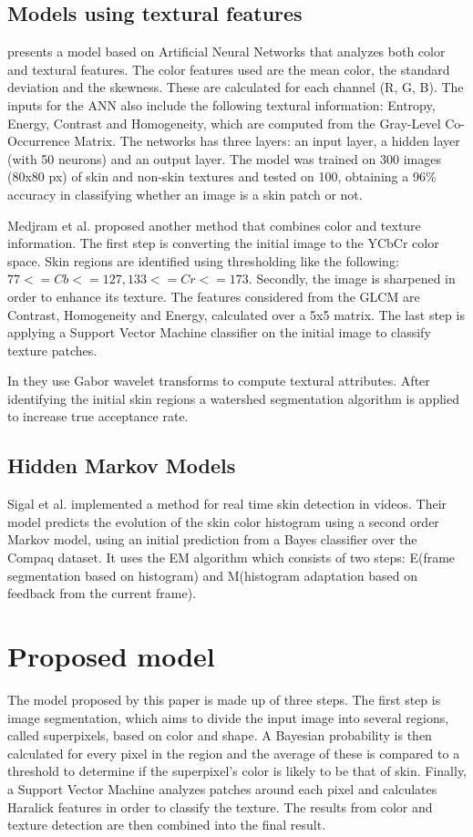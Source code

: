 \documentclass[12pt]{article}
\begin{document}
	\subsection{Models using textural features}
	\cite{color_texture_ann} presents a model based on Artificial Neural Networks that analyzes both color and textural features. The color features used are the mean color, the standard deviation and the skewness. These are calculated for each channel (R, G, B). The inputs for the ANN also include the following textural information: Entropy, Energy, Contrast and Homogeneity, which are computed from the Gray-Level Co-Occurrence Matrix. The networks has three layers: an input layer, a hidden layer (with 50 neurons) and an output layer. The model was trained on 300 images (80x80 px) of skin and non-skin textures and tested on 100, obtaining a 96\% accuracy in classifying whether an image is a skin patch or not.
	
	Medjram et al.\cite{texture_svm} proposed another method that combines color and texture information. The first step is converting the initial image to the YCbCr color space. Skin regions are identified using thresholding like the following: \(77 <= Cb <= 127, 133 <= Cr <= 173\). Secondly, the image is sharpened in order to enhance its texture. The features considered from the GLCM are Contrast, Homogeneity and Energy, calculated over a 5x5 matrix. The last step is applying a Support Vector Machine classifier on the initial image to classify texture patches.
	
	In \cite{texture_gabor_wavelet} they use Gabor wavelet transforms to compute textural attributes. After identifying the initial skin regions a watershed segmentation algorithm is applied to increase true acceptance rate.
	
	\subsection{Hidden Markov Models}
	Sigal et al.\cite{hmm} implemented a method for real time skin detection in videos. Their model predicts the evolution of the skin color histogram using a second order Markov model, using an initial prediction from a Bayes classifier over the Compaq dataset. It uses the EM algorithm which consists of two steps: E(frame segmentation based on histogram) and M(histogram adaptation based on feedback from the current frame).
	
	\section{Proposed model}
	The model proposed by this paper is made up of three steps. The first step is image segmentation, which aims to divide the input image into several regions, called superpixels, based on color and shape. A Bayesian probability is then calculated for every pixel in the region and the average of these is compared to a threshold to determine if the superpixel's color is likely to be that of skin. Finally, a Support Vector Machine analyzes patches around each pixel and calculates Haralick features in order to classify the texture. The results from color and texture detection are then combined into the final result.
	
\end{document}
